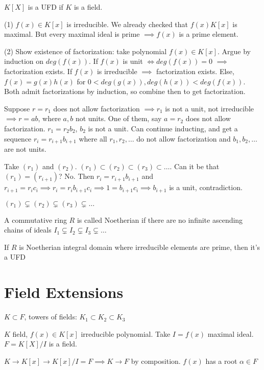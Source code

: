 \documentclass[10pt]{article}
\begin{document}
\begin{exm*}
    $K[X]$ is a UFD if $K$ is a field.
\end{exm*}
(1) $f(x) \in K[x]$ is irreducible. We already checked that $f(x)K[x]$ is maximal. But every maximal ideal is prime $\implies f(x)$ is a prime element.

(2) Show existence of factorization: take polynomial $f(x) \in K[x]$. Argue by induction on $deg(f(x))$. If $f(x)$ is unit $\iff deg(f(x)) = 0$ $\implies$ factorization exists. If $f(x)$ is irreducible $\implies$ factorization exists. Else, $f(x) = g(x)h(x)$ for $0 < deg(g(x)), deg(h(x)) < deg(f(x))$. Both admit factorizations by induction, so combine then to get factorization.

Suppose $r = r_1$ does not allow factorization $\implies r_1$ is not a unit, not irreducible $\implies r = ab$, where $a, b$ not units. One of them, say $a = r_2$ does not allow factorization. $r_1 = r_2b_2$, $b_2$ is not a unit. Can continue inducting, and get a sequence $r_i = r_{i+1}b_{i+1}$ where all $r_1, r_2, \ldots$ do not allow factorization and $b_1, b_2, \ldots$ are not units. 

Take $(r_1)$ and $(r_2)$. $(r_1) \subset (r_2) \subset (r_3) \subset \ldots$. Can it be that $(r_1) = (r_{i +1})$? No. Then $r_i = r_{i +1}b_{i + 1}$ and $r_{i + 1} = r_ic_i \implies r_i = r_ib_{i + 1}c_i \implies 1 = b_{i+1}c_i \implies b_{i +1}$ is a unit, contradiction.

$(r_1) \subsetneq (r_2) \subsetneq (r_3) \subsetneq \ldots$

\begin{defn}
    A commutative ring $R$ is called Noetherian if there are no infinite ascending chains of ideals $I_1 \subsetneq I_2 \subsetneq I_3 \subsetneq \ldots$
\end{defn}

\begin{cor}
    If $R$ is Noetherian integral domain where irreducible elements are prime, then it's a UFD
\end{cor}

\section{Field Extensions}
$K \subset F$, towers of fields: $K_1 \subset K_2 \subset K_3$

$K$ field, $f(x) \in K[x]$ irreducible polynomial. Take $I = f(x)$ maximal ideal. $F = K[X]/I$ is a field.
\begin{thm}
    $K \to K[x] \to K[x]/I = F \implies K \to F$ by composition. $f(x)$ has a root $\alpha \in F$
\end{thm}
\end{document}
